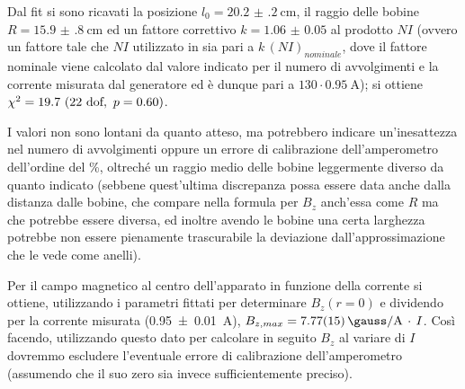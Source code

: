 Dal fit si sono ricavati la posizione $l_0 = \SI{20.2(2)}{\cm} $, il raggio delle bobine $R = \SI{15.9(8)}{\cm}$ ed un fattore correttivo $k = \num{1.06(5)}$ al prodotto $N I$ (ovvero un fattore tale che $N I$ utilizzato in  sia pari a $k \, (N I)_{nominale}$, dove il fattore nominale viene calcolato dal valore indicato per il numero di avvolgimenti e la corrente misurata dal generatore ed è dunque pari a $130 \cdot  \SI{0.95}{\A}$); si ottiene $\chi^2 = 19.7 \ (22 \text{ dof} , \  p = 0.60)$.

I valori non sono lontani da quanto atteso, ma potrebbero indicare un'inesattezza nel numero di avvolgimenti oppure un errore di calibrazione dell'amperometro dell'ordine del \%, oltreché un raggio medio delle bobine leggermente diverso da quanto indicato (sebbene quest'ultima discrepanza possa essere data anche dalla distanza dalle bobine, che compare nella formula per $B_z$ anch'essa come $R$ ma che potrebbe essere diversa, ed inoltre avendo le bobine una certa larghezza potrebbe non essere pienamente trascurabile la deviazione dall'approssimazione che le vede come anelli).

Per il campo magnetico al centro dell'apparato in funzione della corrente si ottiene, utilizzando i parametri fittati per determinare $B_z(r=0)$ e dividendo per la corrente misurata (\SI{0.95(1)}{\A}), $B_{z,max} = \SI{7.77(15)}{\gauss\per\A} \, \cdot \, I$.
Così facendo, utilizzando questo dato per calcolare in seguito $B_z$ al variare di $I$ dovremmo escludere l'eventuale errore di calibrazione dell'amperometro (assumendo che il suo zero sia invece sufficientemente preciso).
